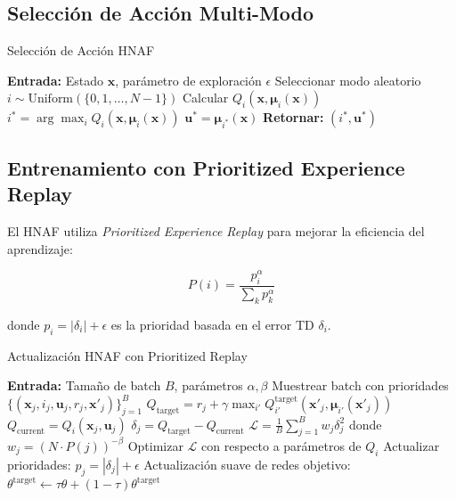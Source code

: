 \documentclass[12pt,a4paper]{article}
\begin{document}
\subsection{Selección de Acción Multi-Modo}

\begin{algorithm}
\caption{Selección de Acción HNAF}
\begin{algorithmic}[1]
\STATE \textbf{Entrada:} Estado $\mathbf{x}$, parámetro de exploración $\epsilon$
    \STATE Seleccionar modo aleatorio $i \sim \text{Uniform}(\{0, 1, \ldots, N-1\})$
\ELSE
        \STATE Calcular $Q_i(\mathbf{x}, \boldsymbol{\mu}_i(\mathbf{x}))$
    \ENDFOR
    \STATE $i^* = \arg\max_i Q_i(\mathbf{x}, \boldsymbol{\mu}_i(\mathbf{x}))$
\ENDIF
\STATE $\mathbf{u}^* = \boldsymbol{\mu}_{i^*}(\mathbf{x})$
\STATE \textbf{Retornar:} $(i^*, \mathbf{u}^*)$
\end{algorithmic}
\end{algorithm}

\subsection{Entrenamiento con Prioritized Experience Replay}

El HNAF utiliza \textit{Prioritized Experience Replay} para mejorar la eficiencia del aprendizaje:

\begin{equation}
P(i) = \frac{p_i^\alpha}{\sum_k p_k^\alpha}
\end{equation}

donde $p_i = |\delta_i| + \epsilon$ es la prioridad basada en el error TD $\delta_i$.

\begin{algorithm}
\caption{Actualización HNAF con Prioritized Replay}
\begin{algorithmic}[1]
\STATE \textbf{Entrada:} Tamaño de batch $B$, parámetros $\alpha, \beta$
        \STATE Muestrear batch con prioridades $\{(\mathbf{x}_j, i_j, \mathbf{u}_j, r_j, \mathbf{x}'_j)\}_{j=1}^B$
            \STATE $Q_{\text{target}} = r_j + \gamma \max_{i'} Q_{i'}^{\text{target}}(\mathbf{x}'_j, \boldsymbol{\mu}_{i'}(\mathbf{x}'_j))$
            \STATE $Q_{\text{current}} = Q_i(\mathbf{x}_j, \mathbf{u}_j)$
            \STATE $\delta_j = Q_{\text{target}} - Q_{\text{current}}$
        \ENDFOR
        \STATE $\mathcal{L} = \frac{1}{B} \sum_{j=1}^B w_j \delta_j^2$ donde $w_j = (N \cdot P(j))^{-\beta}$
        \STATE Optimizar $\mathcal{L}$ con respecto a parámetros de $Q_i$
        \STATE Actualizar prioridades: $p_j = |\delta_j| + \epsilon$
    \ENDIF
\ENDFOR
\STATE Actualización suave de redes objetivo: $\theta^{\text{target}} \leftarrow \tau \theta + (1-\tau) \theta^{\text{target}}$
\end{algorithmic}
\end{algorithm}
\end{document}
